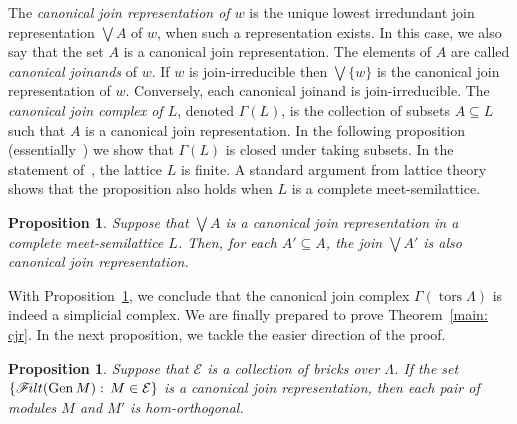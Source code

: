 \documentclass[10pt]{amsart}
\providecommand{\1}{}
\DeclareMathOperator{\tors}{tors}
\newcommand{\calE}{\mathcal{E}}
\newcommand{\filt}{\mathscr{F}\Mk ilt}
\renewcommand{\Join}{\bigvee}
\newcommand{\Meet}{\bigwedge}
\newcommand{\Gen}{\operatorname{Gen}}
\renewcommand{\1}{\hat{1}}
\newcommand{\0}{\hat{0}}
\newcommand{\newword}[1]{\emph{#1}}
\newcommand*{\Mk}{\mkern -2mu}
\newtheorem{proposition}[theorem]{Proposition}
\theoremstyle{definition}
\begin{document}
The \newword{canonical join representation of $w$} is the unique lowest irredundant join representation $\Join A$ of $w$, when such a representation exists.
In this case, we also say that the set $A$ is a canonical join representation.
The elements of $A$ are called \newword{canonical joinands} of $w$.
If $w$ is join-irreducible then $\Join \{w\}$ is the canonical join representation of $w$.
Conversely, each canonical joinand is join-irreducible.
The \newword{canonical join complex of $L$}, denoted $\Gamma(L)$, is the collection of subsets $A\subseteq L$ such that $A$ is a canonical join representation.
In the following proposition (essentially~\cite[Proposition~2.2]{arcs}) we show that $\Gamma(L)$ is closed under taking subsets.
In the statement of~\cite[Proposition~2.2]{arcs}, the lattice $L$ is finite.
A standard argument from lattice theory shows that the proposition also holds when $L$ is a complete meet-semilattice.
\begin{proposition}\label{complex}
Suppose that $\Join A$ is a canonical join representation in a complete meet-semilattice $L$.
Then, for each $A'\subseteq A$, the join $\Join A'$ is also canonical join representation.
\end{proposition}
%
With Proposition~\ref{complex}, we conclude that the canonical join complex $\Gamma(\tors \Lambda)$ is indeed a simplicial complex.
We are finally prepared to prove Theorem~\ref{main: cjr}.
In the next proposition, we tackle the easier direction of the proof.
\begin{proposition}\label{cjr only if}
Suppose that $\calE$ is a collection of bricks over $\Lambda$.
If the set $\{\filt(\Gen M):\, M\in \calE\}$ is a canonical join representation, then each pair of modules $M$ and $M'$ is hom-orthogonal.
\end{proposition}
\end{document}
